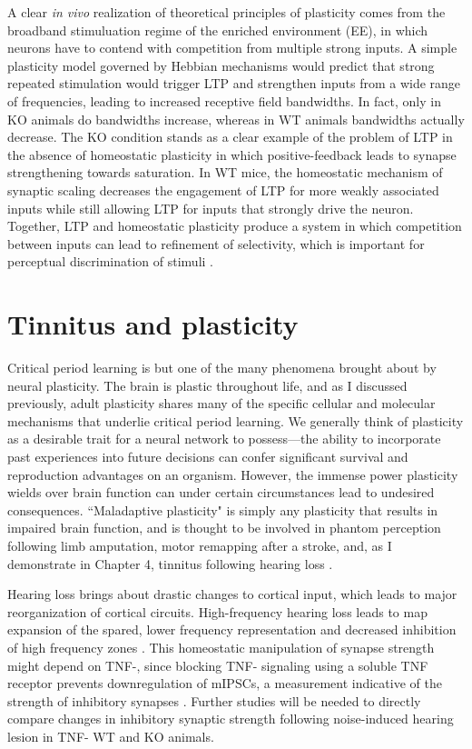 A clear \textit{in vivo} realization of theoretical principles of plasticity comes from the broadband stimuluation regime of the enriched environment (EE), in which neurons have to contend with competition from multiple strong inputs. A simple plasticity model governed by Hebbian mechanisms would predict that strong repeated stimulation would trigger LTP and strengthen inputs from a wide range of frequencies, leading to increased receptive field bandwidths. In fact, only in KO animals do bandwidths increase, whereas in WT animals bandwidths actually decrease. The KO condition stands as a clear example of the problem of LTP in the absence of homeostatic plasticity in which positive-feedback leads to synapse strengthening towards saturation. In WT mice, the homeostatic mechanism of synaptic scaling decreases the engagement of LTP for more weakly associated inputs while still allowing LTP for inputs that strongly drive the neuron. Together, LTP and homeostatic plasticity produce a system in which competition between inputs can lead to refinement of selectivity, which is important for perceptual discrimination of stimuli \cite{Han2007}.

\section{Tinnitus and plasticity}

Critical period learning is but one of the many phenomena brought about by neural plasticity. The brain is plastic throughout life, and as I discussed previously, adult plasticity shares many of the specific cellular and molecular mechanisms that underlie critical period learning. We generally think of plasticity as a desirable trait for a neural network to possess---the ability to incorporate past experiences into future decisions can confer significant survival and reproduction advantages on an organism. However, the immense power plasticity wields over brain function can under certain circumstances lead to undesired consequences. ``Maladaptive plasticity" is simply any plasticity that results in impaired brain function, and is thought to be involved in phantom perception following limb amputation, motor remapping after a stroke, and, as I demonstrate in Chapter 4, tinnitus following hearing loss \cite{Flor2006, Takeuchi2012}.

Hearing loss brings about drastic changes to cortical input, which leads to major reorganization of cortical circuits. High-frequency hearing loss leads to map expansion of the spared, lower frequency representation and decreased inhibition of high frequency zones \cite{Yang2013}. This homeostatic manipulation of synapse strength might depend on TNF-\textalpha{}, since blocking TNF-\textalpha{} signaling using a soluble TNF receptor prevents downregulation of mIPSCs, a measurement indicative of the strength of inhibitory synapses \cite{Stellwagen2006}. Further studies will be needed to directly compare changes in inhibitory synaptic strength following noise-induced hearing lesion in TNF-\textalpha{} WT and KO animals.

